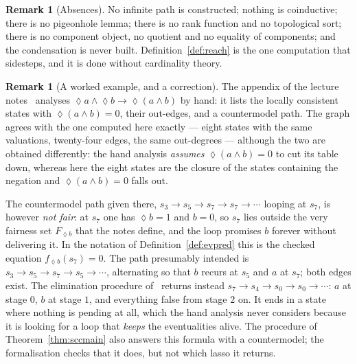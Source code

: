\documentclass[11pt,a4paper]{article}
\theoremstyle{definition}
\newtheorem{remark}[theorem]{Remark}
\newcommand{\Event}{\mathop{\lozenge}}
\begin{document}
\begin{remark}[Absences]
No infinite path is constructed; nothing is coinductive; there is no pigeonhole
lemma; there is no rank function and no topological sort; there is no component
object, no quotient and no equality of components; and the condensation is
never built.  Definition~\ref{def:reach} is the one computation that
\cite[Rem.~3.2]{m4} sidesteps, and it is done without cardinality theory.
\end{remark}

\begin{remark}[A worked example, and a correction]\label{rem:lecture}
The appendix of the lecture notes~\cite{lec} analyses
$\Event a\wedge\Event b\to\Event(a\wedge b)$ by hand: it lists the locally
consistent states with $\Event(a\wedge b)=0$, their out-edges, and a
countermodel path.  The graph agrees with the one computed here exactly ---
eight states with the same valuations, twenty-four edges, the same out-degrees
--- although the two are obtained differently: the hand analysis \emph{assumes}
$\Event(a\wedge b)=0$ to cut its table down, whereas here the eight states are
the closure of the states containing the negation and $\Event(a\wedge b)=0$
falls out.

The countermodel path given there, $s_3\to s_5\to s_7\to s_7\to\cdots$ looping
at $s_7$, is however \emph{not fair}: at $s_7$ one has $\Event b=1$ and $b=0$,
so $s_7$ lies outside the very fairness set $F_{\Event b}$ that the notes
define, and the loop promises $b$ forever without delivering it.  In the
notation of Definition~\ref{def:evpred} this is the checked equation
$f_{\Event b}(s_7)=0$.  The path presumably intended is
$s_3\to s_5\to s_7\to s_5\to\cdots$, alternating so that $b$ recurs at $s_5$ and
$a$ at $s_7$; both edges exist.  The elimination procedure of~\cite{m4}
returns instead $s_7\to s_4\to s_0\to s_0\to\cdots$: $a$ at stage $0$, $b$ at
stage $1$, and everything false from stage $2$ on.  It ends in a state where
nothing is pending at all, which the hand analysis never considers because it
is looking for a loop that \emph{keeps} the eventualities alive.  The procedure
of Theorem~\ref{thm:sccmain} also answers this formula with a countermodel;
the formalisation checks that it does, but not which lasso it returns.
\end{remark}
\end{document}
